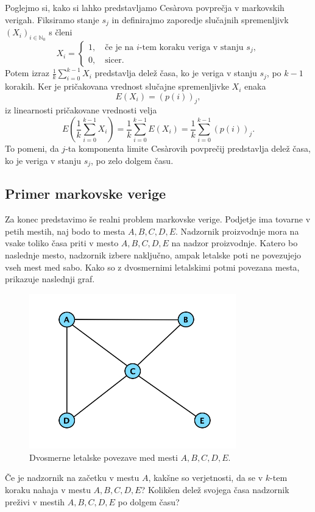 \documentclass[mat1]{fmfdelo}
\newcommand{\N}{\mathbb N}
\begin{document}
Poglejmo si, kako si lahko predstavljamo Ces\`arova povprečja v markovskih verigah. Fiksiramo stanje $s_j$ in definirajmo zaporedje slučajnih spremenljivk $(X_i)_{i\in\N_0}$ s členi
\begin{equation*}
    X_i =
    \begin{cases}
        1, \quad \text{če je na $i$-tem koraku veriga v stanju $s_j$}, \\
        0, \quad \text{sicer}.
    \end{cases}
\end{equation*}
Potem izraz $\frac{1}{k} \sum_{i=0}^{k-1} X_i$ predstavlja delež časa, ko je veriga v stanju $s_j$, po $k-1$ korakih. Ker je pričakovana vrednost slučajne spremenljivke $X_i$ enaka \[E(X_i) = \left(p(i)\right)_j,\] iz linearnosti pričakovane vrednosti velja
\begin{equation*}
    E\left(\frac{1}{k} \sum_{i=0}^{k-1} X_i\right) = \frac{1}{k} \sum_{i=0}^{k-1} E(X_i) = \frac{1}{k} \sum_{i=0}^{k-1} \left(p(i)\right)_j.
\end{equation*}
To pomeni, da $j$-ta komponenta limite Ces\`arovih povprečij predstavlja delež časa, ko je veriga v stanju $s_j$, po zelo dolgem času.

\subsection{Primer markovske verige}
Za konec predstavimo še realni problem markovske verige. Podjetje ima tovarne v petih mestih, naj bodo to mesta $A, B, C, D, E$. Nadzornik proizvodnje mora na vsake toliko časa priti v mesto $A, B, C, D, E$ na nadzor proizvodnje. Katero bo naslednje mesto, nadzornik izbere naključno, ampak letalske poti ne povezujejo vseh mest med sabo. Kako so z dvosmernimi letalskimi potmi povezana mesta, prikazuje naslednji graf.
\begin{figure}[H]
    \centering
    \includegraphics[width=0.8\textwidth]{grafUndir.jpg}
    \caption{Dvosmerne letalske povezave med mesti $A,B,C,D,E$.}
\end{figure}
Če je nadzornik na začetku v mestu $A$, kakšne so verjetnosti, da se v $k$-tem koraku nahaja v mestu $A,B,C,D,E$? Kolikšen delež svojega časa nadzornik preživi v mestih $A,B,C,D,E$ po dolgem času?
\end{document}
